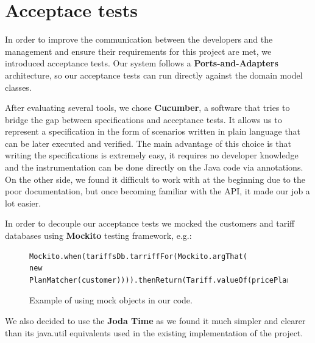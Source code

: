 \documentclass[a4paper]{article}
\begin{document}
\section{Acceptace tests}
In order to improve the communication between the developers and the management and ensure their requirements for this project are met, we introduced acceptance tests. Our system follows a {\bf Ports-and-Adapters} architecture, so our acceptance tests can run directly against the domain model classes.

After evaluating several tools, we chose {\bf Cucumber}, a software that tries to bridge the gap between specifications and acceptance tests. It allows us to represent a specification in the form of scenarios written in plain language that can be later executed and verified. The main advantage of this choice is that writing the specifications is extremely easy, it requires no developer knowledge and the instrumentation can be done directly on the Java code via annotations. On the other side, we found it difficult to work with at the beginning due to the poor documentation, but once becoming familiar with the API, it made our job a lot easier.

In order to decouple our acceptance tests we mocked the customers and tariff databases using {\bf Mockito} testing framework, e.g.:

\begin{figure}[h]
\begin{verbatim}
Mockito.when(tariffsDb.tarriffFor(Mockito.argThat(
new PlanMatcher(customer)))).thenReturn(Tariff.valueOf(pricePlan));
\end{verbatim}
\caption{Example of using mock objects in our code.}
\end{figure}

We also decided to use the {\bf Joda Time} as we found it much simpler and clearer than its java.util equivalents used in the existing implementation of the project.
\end{document}
